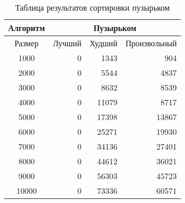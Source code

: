 	\begin{table}[H]
		\label{tab:3}
		\caption{Таблица результатов сортировки пузырьком}
		\begin{tabular}{|c|r|r|r|}
			\hline
			Алгоритм  &     \multicolumn{ 3}{|c|}{Пузырьком} \\
			\hline
			Размер &     Лучший &     Худший & Произвольный \\
			\hline
			1000 &          0 &       1343 &        904 \\
			\hline
			2000 &          0 &       5544 &       4837 \\
			\hline
			3000 &          0 &       8632 &       8539 \\
			\hline
			4000 &          0 &      11079 &       8717 \\
			\hline
			5000 &          0 &      17398 &      13867 \\
			\hline
			6000 &          0 &      25271 &      19930 \\
			\hline
			7000 &          0 &      34136 &      27401 \\
			\hline
			8000 &          0 &      44612 &      36021 \\
			\hline
			9000 &          0 &      56303 &      45723 \\
			\hline
			10000 &          0 &      73336 &      60571 \\
			\hline
		\end{tabular}  
	\end{table}